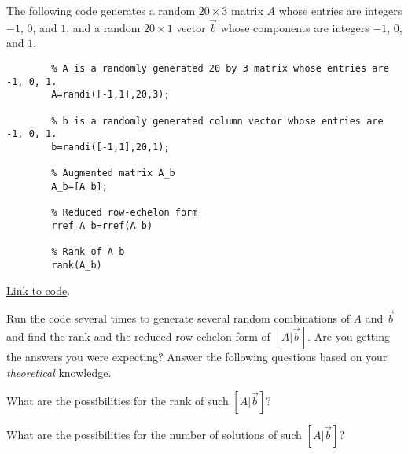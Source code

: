 \documentclass{ximera}
\begin{document}
\begin{problem}\label{prob_oct_sys_3}
    The following code generates a random $20\times 3$ matrix $A$ whose entries are integers $-1$, $0$, and $1$, and a random $20\times 1$ vector $\vec{b}$ whose components are integers $-1$, $0$, and $1$.  

    \begin{verbatim} 
        % A is a randomly generated 20 by 3 matrix whose entries are -1, 0, 1.
        A=randi([-1,1],20,3);
        
        % b is a randomly generated column vector whose entries are -1, 0, 1.
        b=randi([-1,1],20,1);
        
        % Augmented matrix A_b
        A_b=[A b];
        
        % Reduced row-echelon form
        rref_A_b=rref(A_b)
        
        % Rank of A_b
        rank(A_b)
    \end{verbatim}

    \href{https://sagecell.sagemath.org/?z=eJx9jr0OgkAQhHsS3mEaEknAgJbG4l7BlhByB4sQubtkAX_e3kWxMtrtz8w3E0GhH6HB2jXeDg-cyRHriRrsMpgH9rB64v6OW-dHAjlZSBxMSPMEWYJ8GwbquAD6TSG3vEx2WbKPD2EQBhHMz4DaD7N1uFI9ef7PN1_8_MNX89mKS3hrUVUZKVSZY6FgylV1omauRcP-llLd0eAdWs82DJiprRb5MmxkiFeHdhf49o2T9Mvr9wQYpVrl&lang=octave&interacts=eJyLjgUAARUAuQ==}{Link to code}.
    
    Run the code several times to generate several random combinations of $A$ and $\vec{b}$ and find the rank and the reduced row-echelon form of $[A | \vec{b}]$.  Are you getting the answers you were expecting?  Answer the following questions based on your \emph{theoretical} knowledge.

    What are the possibilities for the rank of such $[A | \vec{b}]$?  

    \begin{multipleChoice}
    \end{multipleChoice}

    What are the possibilities for the number of solutions of such $[A | \vec{b}]$?

    \begin{multipleChoice}
    \end{multipleChoice}


\end{problem}
\end{document}
